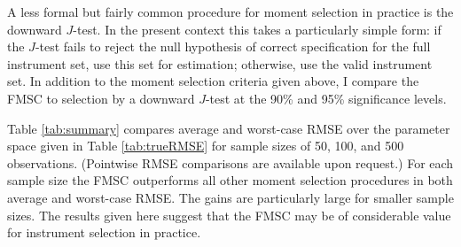 \documentclass[12pt]{article}
\theoremstyle{definition}
\begin{document}
A less formal but fairly common procedure for moment selection in practice is the downward $J$-test. In the present context this takes a particularly simple form: if the $J$-test fails to reject the null hypothesis of correct specification for the full instrument set, use this set for estimation; otherwise, use the valid instrument set. In addition to the moment selection criteria given above, I compare the FMSC to selection by a downward $J$-test at the 90\% and 95\% significance levels. 

Table \ref{tab:summary} compares average and worst-case RMSE over the parameter space given in Table \ref{tab:trueRMSE} for sample sizes of 50, 100, and 500 observations. (Pointwise RMSE comparisons are available upon request.) For each sample size the FMSC outperforms all other moment selection procedures in both average and worst-case RMSE. The gains are particularly large for smaller sample sizes. The results given here suggest that the FMSC may be of considerable value for instrument selection in practice.
\end{document}
